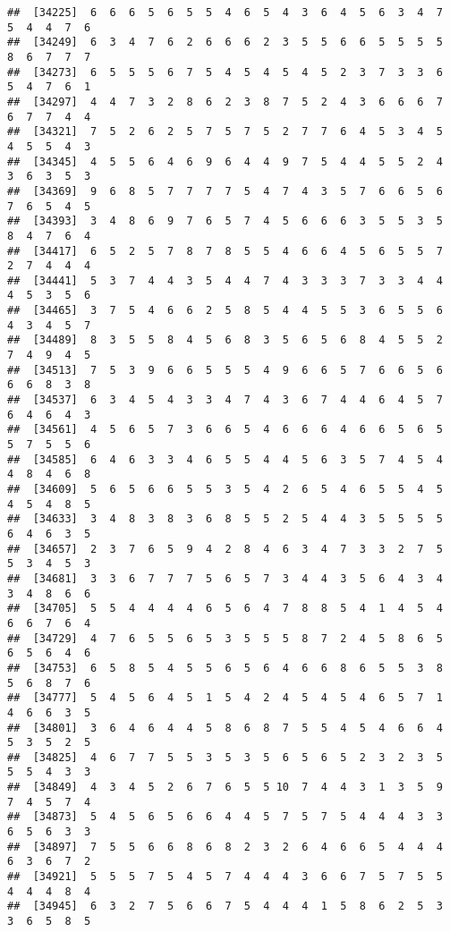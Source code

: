 \documentclass[
]{book}
\begin{document}
\begin{verbatim}
##  [34225]  6  6  6  5  6  5  5  4  6  5  4  3  6  4  5  6  3  4  7  5  4  4  7  6
##  [34249]  6  3  4  7  6  2  6  6  6  2  3  5  5  6  6  5  5  5  5  8  6  7  7  7
##  [34273]  6  5  5  5  6  7  5  4  5  4  5  4  5  2  3  7  3  3  6  5  4  7  6  1
##  [34297]  4  4  7  3  2  8  6  2  3  8  7  5  2  4  3  6  6  6  7  6  7  7  4  4
##  [34321]  7  5  2  6  2  5  7  5  7  5  2  7  7  6  4  5  3  4  5  4  5  5  4  3
##  [34345]  4  5  5  6  4  6  9  6  4  4  9  7  5  4  4  5  5  2  4  3  6  3  5  3
##  [34369]  9  6  8  5  7  7  7  7  5  4  7  4  3  5  7  6  6  5  6  7  6  5  4  5
##  [34393]  3  4  8  6  9  7  6  5  7  4  5  6  6  6  3  5  5  3  5  8  4  7  6  4
##  [34417]  6  5  2  5  7  8  7  8  5  5  4  6  6  4  5  6  5  5  7  2  7  4  4  4
##  [34441]  5  3  7  4  4  3  5  4  4  7  4  3  3  3  7  3  3  4  4  4  5  3  5  6
##  [34465]  3  7  5  4  6  6  2  5  8  5  4  4  5  5  3  6  5  5  6  4  3  4  5  7
##  [34489]  8  3  5  5  8  4  5  6  8  3  5  6  5  6  8  4  5  5  2  7  4  9  4  5
##  [34513]  7  5  3  9  6  6  5  5  5  4  9  6  6  5  7  6  6  5  6  6  6  8  3  8
##  [34537]  6  3  4  5  4  3  3  4  7  4  3  6  7  4  4  6  4  5  7  6  4  6  4  3
##  [34561]  4  5  6  5  7  3  6  6  5  4  6  6  6  4  6  6  5  6  5  5  7  5  5  6
##  [34585]  6  4  6  3  3  4  6  5  5  4  4  5  6  3  5  7  4  5  4  4  8  4  6  8
##  [34609]  5  6  5  6  6  5  5  3  5  4  2  6  5  4  6  5  5  4  5  4  5  4  8  5
##  [34633]  3  4  8  3  8  3  6  8  5  5  2  5  4  4  3  5  5  5  5  6  4  6  3  5
##  [34657]  2  3  7  6  5  9  4  2  8  4  6  3  4  7  3  3  2  7  5  5  3  4  5  3
##  [34681]  3  3  6  7  7  7  5  6  5  7  3  4  4  3  5  6  4  3  4  3  4  8  6  6
##  [34705]  5  5  4  4  4  4  6  5  6  4  7  8  8  5  4  1  4  5  4  6  6  7  6  4
##  [34729]  4  7  6  5  5  6  5  3  5  5  5  8  7  2  4  5  8  6  5  6  5  6  4  6
##  [34753]  6  5  8  5  4  5  5  6  5  6  4  6  6  8  6  5  5  3  8  5  6  8  7  6
##  [34777]  5  4  5  6  4  5  1  5  4  2  4  5  4  5  4  6  5  7  1  4  6  6  3  5
##  [34801]  3  6  4  6  4  4  5  8  6  8  7  5  5  4  5  4  6  6  4  5  3  5  2  5
##  [34825]  4  6  7  7  5  5  3  5  3  5  6  5  6  5  2  3  2  3  5  5  5  4  3  3
##  [34849]  4  3  4  5  2  6  7  6  5  5 10  7  4  4  3  1  3  5  9  7  4  5  7  4
##  [34873]  5  4  5  6  5  6  6  4  4  5  7  5  7  5  4  4  4  3  3  6  5  6  3  3
##  [34897]  7  5  5  6  6  8  6  8  2  3  2  6  4  6  6  5  4  4  4  6  3  6  7  2
##  [34921]  5  5  5  7  5  4  5  7  4  4  4  3  6  6  7  5  7  5  5  4  4  4  8  4
##  [34945]  6  3  2  7  5  6  6  7  5  4  4  4  1  5  8  6  2  5  3  3  6  5  8  5

\end{verbatim}
\end{document}
